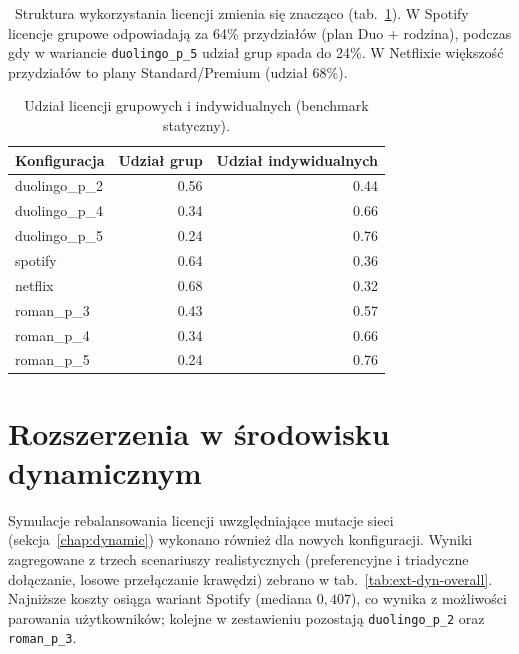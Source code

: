 \
Struktura wykorzystania licencji zmienia się znacząco (tab.~\ref{tab:ext-license-mix}). W Spotify licencje grupowe odpowiadają za 64\% przydziałów (plan Duo + rodzina), podczas gdy w wariancie \texttt{duolingo\_p\_5} udział grup spada do 24\%. W Netflixie większość przydziałów to plany Standard/Premium (udział 68\%).

\begin{table}[H]
  \centering
  \caption{Udział licencji grupowych i indywidualnych (benchmark statyczny).}
  \label{tab:ext-license-mix}
  \begin{tabular}{lrr}
    \toprule
    \textbf{Konfiguracja} & \textbf{Udział grup} & \textbf{Udział indywidualnych} \\
    \midrule
    duolingo\_p\_2        & 0.56                 & 0.44                           \\
    duolingo\_p\_4        & 0.34                 & 0.66                           \\
    duolingo\_p\_5        & 0.24                 & 0.76                           \\
    spotify               & 0.64                 & 0.36                           \\
    netflix               & 0.68                 & 0.32                           \\
    roman\_p\_3           & 0.43                 & 0.57                           \\
    roman\_p\_4           & 0.34                 & 0.66                           \\
    roman\_p\_5           & 0.24                 & 0.76                           \\
  \end{tabular}
\end{table}

\section{Rozszerzenia w środowisku dynamicznym}

Symulacje rebalansowania licencji uwzględniające mutacje sieci (sekcja~\ref{chap:dynamic}) wykonano również dla nowych konfiguracji. Wyniki zagregowane z trzech scenariuszy realistycznych (preferencyjne i triadyczne dołączanie, losowe przełączanie krawędzi) zebrano w tab.~\ref{tab:ext-dyn-overall}. Najniższe koszty osiąga wariant Spotify (mediana $0{,}407$), co wynika z możliwości parowania użytkowników; kolejne w zestawieniu pozostają \texttt{duolingo\_p\_2} oraz \texttt{roman\_p\_3}.

